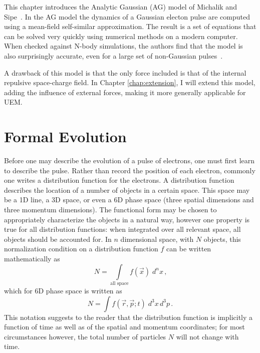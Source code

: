 
This chapter introduces the Analytic Gaussian (AG) model of Michalik and Sipe~\cite{michalik_analytic_2006}.
In the AG model the dynamics of a Gaussian electon pulse are computed using a mean-field self-similar approximation.
The result is a set of equations that can be solved very quickly using numerical methods on a modern computer.
When checked against N-body simulations, the authors find that the model is also surprisingly accurate, even for a large set of non-Gaussian pulses~\cite{michalik_analytic_2006,michalik_evolution_2009}.

A drawback of this model is that the only force included is that of the internal repulsive space-charge field.
In Chapter \ref{chap:extension}, I will extend this model, adding the influence of external forces, making it more generally applicable for UEM.

\section{Formal Evolution} \label{sec:formal_evolution}

Before one may describe the evolution of a pulse of electrons, one must first learn to describe the pulse.
Rather than record the position of each electron, commonly one writes a distribution function for the electrons.
A distribution function describes the location of a number of objects in a certain space.
This space may be a 1D line, a 3D space, or even a 6D phase space (three spatial dimensions and three momentum dimensions).
The functional form may be chosen to appropriately characterize the objects in a natural way, however one property is true for all distribution functions: when integrated over all relevant space, all objects should be accounted for.
In $n$ dimensional space, with $N$ objects, this normalization condition on a distribution function $f$ can be written mathematically as
\begin{equation}
  N = \int\limits_{\text{all space}} \!\!\! f(\vec{x}) \; d^{n}x \,\text{,}
\end{equation}
which for 6D phase space is written as
\begin{equation} \label{eq:normalization}
  N = \int f (\vec{r}, \vec{p}; t) \; d^{3}x\,d^{3}p \,\text{.}
\end{equation}
This notation suggests to the reader that the distribution function is implicitly a function of time as well as of the spatial and momentum coordinates; for most circumstances however, the total number of particles $N$ will not change with time.

